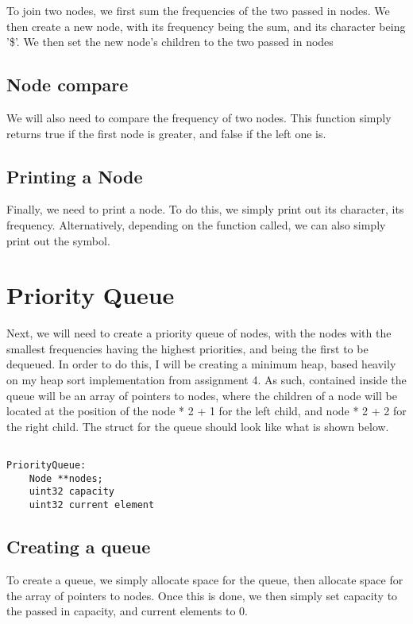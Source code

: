 \documentclass[11pt]{article}
\begin{document}
To join two nodes, we first sum the frequencies of the two passed in nodes. We then create a new node, with its frequency being the sum, and its character being '\$'. We then set the new node's children to the two passed in nodes

\subsection{Node compare}

We will also need to compare the frequency of two nodes. This function simply returns true if the first node is greater, and false if the left one is.

\subsection{Printing a Node}

Finally, we need to print a node. To do this, we simply print out its character, its frequency. Alternatively, depending on the function called, we can also simply print out the symbol.

\section{Priority Queue}

Next, we will need to create a priority queue of nodes, with the nodes with the smallest frequencies having the highest priorities, and being the first to be dequeued. In order to do this, I will be creating a minimum heap, based heavily on my heap sort implementation from assignment 4. As such, contained inside the queue will be an array of pointers to nodes, where the children of a node will be located at the position of the node * 2 + 1 for the left child, and node * 2 + 2 for the right child. The struct for the queue should look like what is shown below.

\begin{verbatim}

PriorityQueue:
    Node **nodes;
    uint32 capacity
    uint32 current element

\end{verbatim}

\subsection{Creating a queue}

To create a queue, we simply allocate space for the queue, then allocate space for the array of pointers to nodes. Once this is done, we then simply set capacity to the passed in capacity, and current elements to 0.
\end{document}
